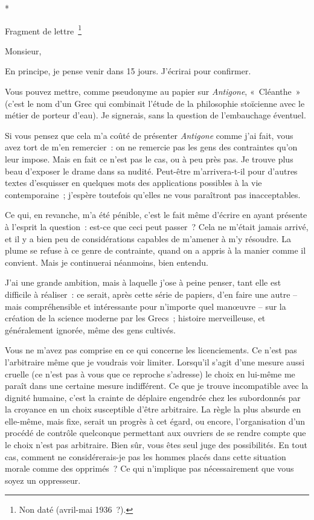 \documentclass[french,twoside]{book} %
\begin{document}
\begin{center}
*\end{center}

\begin{center}
Fragment de lettre \footnote{Non daté (avril-mai 1936 ?).}\end{center}
\noindent Monsieur,\par
En principe, je pense venir dans 15 jours. J'écrirai pour confirmer.\par
Vous pouvez mettre, comme pseudonyme au papier sur {\itshape Antigone}, « Cléanthe » (c'est le nom d'un Grec qui combinait l'étude de la philosophie stoïcienne avec le métier de porteur d'eau). Je signerais, sans la question de l'embauchage éventuel.\par
Si vous pensez que cela m'a coûté de présenter {\itshape Antigone} comme j'ai fait, vous avez tort de m'en remercier : on ne remercie pas les gens des contraintes qu'on leur impose. Mais en fait ce n'est pas le cas, ou à peu près pas. Je trouve plus beau d'exposer le drame dans sa nudité. Peut-être m'arrivera-t-il pour d'autres textes d'esquisser en quelques mots des applications possibles à la vie contemporaine ; j'espère toutefois qu'elles ne vous paraîtront pas inacceptables.\par
Ce qui, en revanche, m'a été pénible, c'est le fait même d'écrire en ayant présente à l'esprit la question : est-ce que ceci peut passer ? Cela ne m'était jamais arrivé, et il y a bien peu de considérations capables de m'amener à m'y résoudre. La plume se refuse à ce genre de contrainte, quand on a appris à la manier comme il convient. Mais je continuerai néanmoins, bien entendu.\par
J'ai une grande ambition, mais à laquelle j'ose à peine penser, tant elle est difficile à réaliser : ce serait, après cette série de papiers, d'en faire une autre – mais compréhensible et intéressante pour n'importe quel manœuvre – sur la création de la science moderne par les Grecs ; histoire merveilleuse, et généralement ignorée, même des gens cultivés.\par
Vous ne m'avez pas comprise en ce qui concerne les licenciements. Ce n'est pas l'arbitraire même que je voudrais voir limiter. Lorsqu'il s'agit d'une mesure aussi cruelle (ce n'est pas à vous que ce reproche s'adresse) le choix en lui-même me paraît dans une certaine mesure indifférent. Ce que je trouve incompatible avec la dignité humaine, c'est la crainte de déplaire engendrée chez les subordonnés par la croyance en un choix susceptible d'être arbitraire. La règle la plus absurde en elle-même, mais fixe, serait un progrès à cet égard, ou encore, l'organisation d'un procédé de contrôle quelconque permettant aux ouvriers de se rendre compte que le choix n'est pas arbitraire. Bien sûr, vous êtes seul juge des possibilités. En tout cas, comment ne considérerais-je pas les hommes placés dans cette situation morale comme des opprimés ? Ce qui n'implique pas nécessairement que vous soyez un oppresseur.\par
\end{document}
